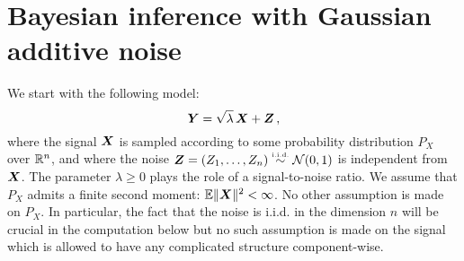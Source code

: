 \documentclass[12pt,nocut]{article}
\begin{document}
\section{Bayesian inference with Gaussian additive noise}\label{sec:i_mmse}

We start with the following model:
\begin{equation}\label{eq:inference}
	{\boldsymbol Y} = \sqrt{\lambda} \, {\boldsymbol X} + {\boldsymbol Z} \,,
\end{equation}
where the signal ${\boldsymbol X}$ is sampled according to some probability distribution $P_X$ over $\mathbb{R}^n$, and where the noise ${\boldsymbol Z} =(Z_1, \dots, Z_n) \overset{\text{\tiny i.i.d.}}{\sim} \mathcal{N}(0,1)$ is independent from ${\boldsymbol X}$. 
The parameter $\lambda \geq 0$ plays the role of a signal-to-noise ratio.
We assume that $P_X$ admits a finite second moment: $\mathbb{E} \|{\boldsymbol X}\|^2 < \infty$. No other assumption is made on $P_X$. In particular, the fact that the noise is i.i.d. in the dimension $n$ will be crucial in the computation below but no such assumption is made on the signal which is allowed to have any complicated structure component-wise.
\end{document}
